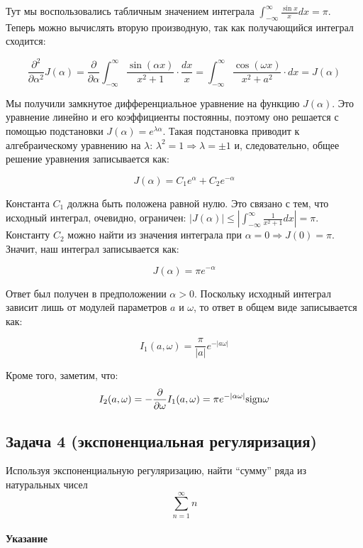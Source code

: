 \documentclass[a4paper,12pt]{article}
\begin{document}
\noindent
Тут мы воспользовались табличным значением интеграла $\int_{-\infty}^{\infty}\frac{\sin x}{x}dx=\pi$.
Теперь можно вычислять вторую производную, так как получающийся интеграл
сходится:

\[
\frac{\partial^{2}}{\partial\alpha^{2}}J(\alpha)=\frac{\partial}{\partial\alpha}\int_{-\infty}^{\infty}\frac{\sin(\alpha x)}{x^{2}+1}\cdot\frac{dx}{x}=\int_{-\infty}^{\infty}\frac{\cos(\omega x)}{x^{2}+a^{2}}\cdot dx=J(\alpha)
\]

\noindent
Мы получили замкнутое дифференциальное уравнение на функцию $J(\alpha)$.
Это уравнение линейно и его коэффициенты постоянны, поэтому оно
решается с помощью подстановки $J(\alpha)=e^{\lambda\alpha}$. Такая
подстановка приводит к алгебраическому уравнению на $\lambda$: $\lambda^{2}=1\Rightarrow\lambda=\pm1$
и, следовательно, общее решение уравнения записывается как:

\[
J(\alpha)=C_{1}e^{\alpha}+C_{2}e^{-\alpha}
\]

\noindent
Константа $C_{1}$ должна быть положена равной нулю. Это связано с
тем, что исходный интеграл, очевидно, ограничен: $\left|J\left(\alpha\right)\right|\leq\left|\int_{-\infty}^{\infty}\frac{1}{x^{2}+1}dx\right|=\pi$.
Константу $C_{2}$ можно найти из значения интеграла при $\alpha=0\Rightarrow J(0)=\pi$.
Значит, наш интеграл записывается как:

\[
J(\alpha)=\pi e^{-\alpha}
\]

\noindent
Ответ был получен в предположении $\alpha>0$. Поскольку исходный
интеграл зависит лишь от модулей параметров $a$ и $\omega$, то ответ
в общем виде записывается как:

\[
I_{1}(a,\omega)=\frac{\pi}{\left|a\right|}e^{-\left|a\omega\right|}
\]

\noindent
Кроме того, заметим, что:
\[
I_{2}(a,\omega)=-\frac{\partial}{\partial\omega}I_{1}(a,\omega)=\pi e^{-\left|\alpha\omega\right|}{\rm sign}\omega
\]

\subsection*{Задача 4 (экспоненциальная регуляризация)}

Используя экспоненциальную регуляризацию, найти ``сумму'' ряда из
натуральных чисел 
\[
\sum_{n=1}^{\infty}n
\]



\paragraph{Указание}
\end{document}
